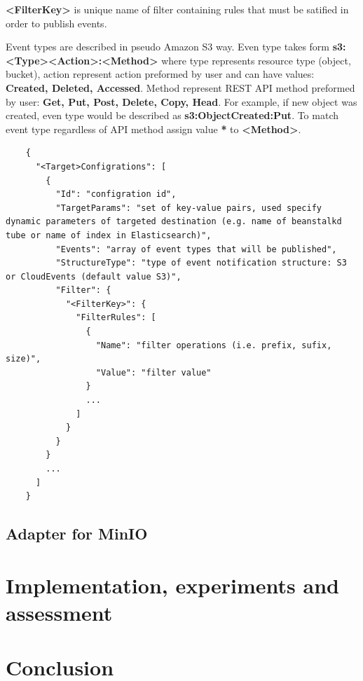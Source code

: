     \textbf{<FilterKey>} is unique name of filter containing rules that must be satified in order to publish events.

    Event types are described in pseudo Amazon S3 way. Even type takes form \textbf{s3:<Type><Action>:<Method>} where type represents resource type (object, bucket), action represent action preformed by user and can have values: \textbf{Created, Deleted, Accessed}. Method represent REST API method preformed by user: \textbf{Get, Put, Post, Delete, Copy, Head}. For example, if new object was created, even type would be described as \textbf{s3:ObjectCreated:Put}. To match event type regardless of API method assign value \textbf{*} to \textbf{<Method>}.

    \begin{lstlisting}
    {
      "<Target>Configrations": [
        {
          "Id": "configration id",
          "TargetParams": "set of key-value pairs, used specify dynamic parameters of targeted destination (e.g. name of beanstalkd tube or name of index in Elasticsearch)",
          "Events": "array of event types that will be published",
          "StructureType": "type of event notification structure: S3 or CloudEvents (default value S3)",
          "Filter": {
            "<FilterKey>": {
              "FilterRules": [
                {
                  "Name": "filter operations (i.e. prefix, sufix, size)",
                  "Value": "filter value"
                }
                ...
              ]
            }
          }
        }
        ...
      ]
    }
    \end{lstlisting}


\section{Adapter for MinIO}
\chapter{Implementation, experiments and assessment}

\chapter{Conclusion}

